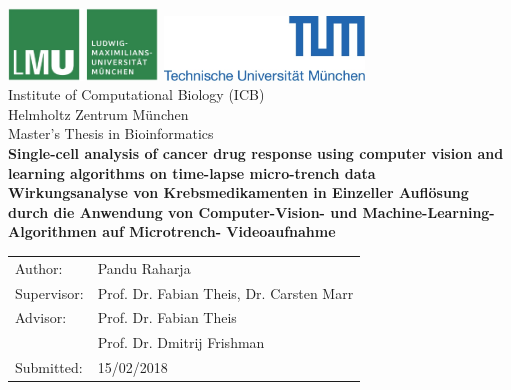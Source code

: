 \documentclass[pdftex,12pt,a4paper]{report}
\begin{document}
\begin{titlepage}
{\sffamily


\begin{center}
\includegraphics[width=0.3\textwidth]{logo2.jpg}
\hfill
\includegraphics[width=0.4\textwidth]{logo1.jpg}  
\\[1.5cm]  

{\Large Institute of Computational Biology (ICB)}\\[0.5cm]
{\Large Helmholtz Zentrum M\"unchen}\\[1cm]


{\Large Master's Thesis in Bioinformatics}\\[2cm]
{\textbf{\Large Single-cell analysis of cancer drug response using computer vision and learning algorithms on time-lapse micro-trench data}}\\[2cm]
{\textbf{\Large Wirkungsanalyse von Krebsmedikamenten in Einzeller Aufl\"osung durch die Anwendung von Computer-Vision- und Machine-Learning-Algorithmen auf Microtrench- Videoaufnahme}}\\[4cm]

\end{center}
\begin{center}\Large
  \begin{tabular}{ll}
    Author:& Pandu Raharja\\
    Supervisor: &  Prof. Dr. Fabian Theis, Dr. Carsten Marr\\
    Advisor:        &  Prof. Dr. Fabian Theis\\
    & Prof. Dr. Dmitrij Frishman\\
    Submitted:     &  15/02/2018
  \end{tabular}
\end{center}

}%

\end{titlepage}
\end{document}
